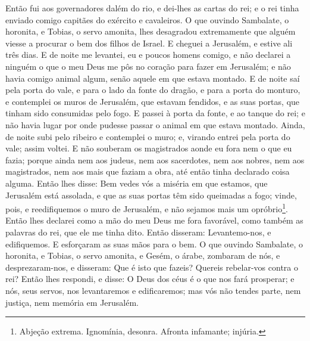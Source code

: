 Então fui aos governadores dalém do rio, e dei-lhes as cartas do
rei; e o rei tinha enviado comigo capitães do exército e cavaleiros.
O que ouvindo Sambalate, o horonita, e Tobias, o servo
amonita, lhes desagradou extremamente que alguém viesse a procurar o
bem dos filhos de Israel. E cheguei a Jerusalém, e estive ali
três dias. E de noite me levantei, eu e poucos homens comigo,
e não declarei a ninguém o que o meu Deus me pôs no coração para
fazer em Jerusalém; e não havia comigo animal algum, senão aquele em
que estava montado. E de noite saí pela porta do vale, e para
o lado da fonte do dragão, e para a porta do monturo, e contemplei
os muros de Jerusalém, que estavam fendidos, e as suas portas, que
tinham sido consumidas pelo fogo. E passei à porta da fonte,
e ao tanque do rei; e não havia lugar por onde pudesse passar o
animal em que estava montado. Ainda, de noite subi pelo
ribeiro e contemplei o muro; e, virando entrei pela porta do vale;
assim voltei. E não souberam os magistrados aonde eu fora nem
o que eu fazia; porque ainda nem aos judeus, nem aos sacerdotes, nem
aos nobres, nem aos magistrados, nem aos mais que faziam a obra, até
então tinha declarado coisa alguma. Então lhes disse: Bem
vedes vós a miséria em que estamos, que Jerusalém está assolada, e
que as suas portas têm sido queimadas a fogo; vinde, pois, e
reedifiquemos o muro de Jerusalém, e não sejamos mais um
opróbrio\footnote{Abjeção extrema. Ignomínia, desonra. Afronta
infamante; injúria.}. Então lhes declarei como a mão do meu
Deus me fora favorável, como também as palavras do rei, que ele me
tinha dito. Então disseram: Levantemo-nos, e edifiquemos. E
esforçaram as suas mãos para o bem. O que ouvindo Sambalate,
o horonita, e Tobias, o servo amonita, e Gesém, o árabe, zombaram de
nós, e desprezaram-nos, e disseram: Que é isto que fazeis? Quereis
rebelar-vos contra o rei? Então lhes respondi, e disse: O
Deus dos céus é o que nos fará prosperar; e nós, seus servos, nos
levantaremos e edificaremos; mas vós não tendes parte, nem justiça,
nem memória em Jerusalém.

\medskip

